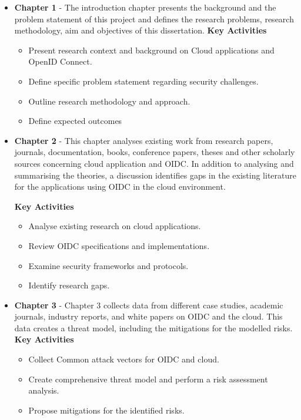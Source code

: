 \begin{itemize}
    \item \textbf{Chapter 1} - The introduction chapter presents the background and the problem statement of this project and defines the research problems, research methodology, aim and objectives of this dissertation.\newline
    \textbf{Key Activities}
    \begin{itemize}
        \item Present research context and background on Cloud applications and OpenID Connect.
        \item Define specific problem statement regarding security challenges.
        \item Outline research methodology and approach.
        \item Define expected outcomes
    \end{itemize}

    \item \textbf{Chapter 2} - This chapter analyses existing work from research papers, journals, documentation, books, conference papers, theses and other scholarly sources concerning cloud application and OIDC. In addition to analysing and summarising the theories, a discussion identifies gaps in the existing literature for the applications using OIDC in the cloud environment.\newline

    \textbf{Key Activities}
    \begin{itemize}
        \item Analyse existing research on cloud applications.
        \item Review OIDC specifications and implementations.
        \item Examine security frameworks and protocols.
        \item Identify research gaps.
    \end{itemize}
    
    \item \textbf{Chapter 3} - Chapter 3 collects data from different case studies, academic journals, industry reports, and white papers on OIDC and the cloud. This data creates a threat model, including the mitigations for the modelled risks. \newline
    \textbf{Key Activities}
    \begin{itemize}
        \item Collect Common attack vectors for OIDC and cloud.
        \item Create comprehensive threat model and perform a risk assessment analysis.
        \item Propose mitigations for the identified risks.
    \end{itemize}
    

\end{itemize}
